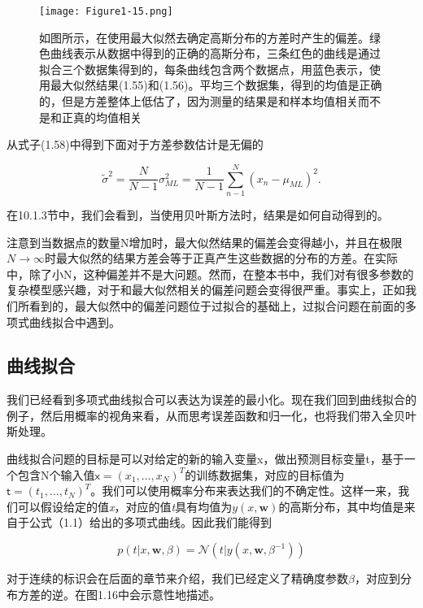 	\begin{figure}[t]
		\parbox{.5\textwidth}{\caption{  如图所示，在使用最大似然去确定高斯分布的方差时产生的偏差。绿色曲线表示从数据中得到的正确的高斯分布，三条红色的曲线是通过拟合三个数据集得到的，每条曲线包含两个数据点，用蓝色表示，使用最大似然结果(1.55)和(1.56)。平均三个数据集，得到的均值是正确的，但是方差整体上低估了，因为测量的结果是和样本均值相关而不是和正真的均值相关 }}
		\parbox{.5\textwidth}{\texttt{[image: Figure1-15.png]}}
	\end{figure}
	
	从式子(1.58)中得到下面对于方差参数估计是无偏的
	
	\begin{equation}
	\tilde{\sigma}^2 = \frac{N}{N - 1}\sigma_{ML}^2 = \frac{1}{N - 1} \sum_{n - 1}^{N}(x_n - \mu_{ML})^2.
	\end{equation}
	
	在10.1.3节中，我们会看到，当使用贝叶斯方法时，结果是如何自动得到的。
	
	注意到当数据点的数量N增加时，最大似然结果的偏差会变得越小，并且在极限$N \to \infty$时最大似然的结果方差会等于正真产生这些数据的分布的方差。在实际中，除了小N，这种偏差并不是大问题。然而，在整本书中，我们对有很多参数的复杂模型感兴趣，对于和最大似然相关的偏差问题会变得很严重。事实上，正如我们所看到的，最大似然中的偏差问题位于过拟合的基础上，过拟合问题在前面的多项式曲线拟合中遇到。
	
\subsection{曲线拟合}
	我们已经看到多项式曲线拟合可以表达为误差的最小化。现在我们回到曲线拟合的例子，然后用概率的视角来看，从而思考误差函数和归一化，也将我们带入全贝叶斯处理。
	
	曲线拟合问题的目标是可以对给定的新的输入变量x，做出预测目标变量t，基于一个包含N个输入值$\mathsf{x} = (x_1, \dots, x_N)^T$的训练数据集，对应的目标值为$\mathsf{t} = (t_1, \dots, t_N)^T$。我们可以使用概率分布来表达我们的不确定性。这样一来，我们可以假设给定的值\textit{x}，对应的值\textit{t}具有均值为$y(x, \textbf{w})$的高斯分布，其中均值是来自于公式（1.1）给出的多项式曲线。因此我们能得到
	
	\begin{equation}
	p(t |x, \textbf{w}, \beta) = \mathcal{N}(t| y(x,\textbf{w}, \beta^{-1}))
	\end{equation}

	对于连续的标识会在后面的章节来介绍，我们已经定义了精确度参数$\beta$，对应到分布方差的逆。在图1.16中会示意性地描述。
	
